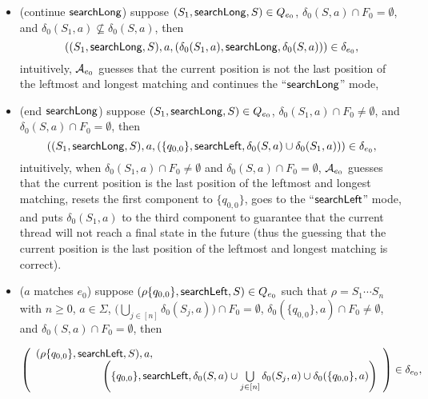 \begin{itemize}
\begin{itemize}
		\item (continue $\mathsf{searchLong}$) suppose $(S_1, \mathsf{searchLong}, S) \in Q_{e_0}$, $\delta_0(S,a) \cap F_0 = \emptyset$, and $\delta_0(S_1,a) \not \subseteq \delta_0(S,a)$, then 
		$$((S_1, \mathsf{searchLong}, S), a, (\delta_0(S_1,a), \mathsf{searchLong}, \delta_0(S,a))) \in \delta_{e_0},$$
		intuitively, $\mathcal{A}_{e_0}$ guesses that the current position is not the last position of the leftmost and longest matching and continues the ``$\mathsf{searchLong}$'' mode,
		\item (end $\mathsf{searchLong}$) suppose $(S_1, \mathsf{searchLong}, S) \in Q_{e_0}$, $\delta_0(S_1,a) \cap F_0 \neq \emptyset$, and $\delta_0(S,a) \cap F_0 = \emptyset$, then 
		$$((S_1, \mathsf{searchLong}, S), a, (\{q_{0,0}\}, \mathsf{searchLeft}, \delta_0(S,a) \cup \delta_0(S_1,a))) \in \delta_{e_0},$$
		intuitively, when $\delta_0(S_1,a) \cap F_0 \neq \emptyset$ and $\delta_0(S,a) \cap F_0 = \emptyset$, $\mathcal{A}_{e_0}$ guesses that the current position is the last position of the leftmost and longest matching, resets the first component to $\{q_{0,0}\}$, goes to the ``$\mathsf{searchLeft}$'' mode, and puts $\delta_0(S_1, a)$ to the third component to guarantee that the current thread will not reach a final state in the future (thus the guessing that the current position is the last position of the leftmost and longest matching is correct).
		\item ($a$ matches $e_0$) suppose $(\rho \{q_{0,0}\}, \mathsf{searchLeft}, S) \in Q_{e_0}$ such that $\rho = S_1 \cdots S_n$ with $n \ge 0$,  $a \in \Sigma$, $\big(\bigcup \limits_{j \in [n]} \delta_0(S_j, a) \big) \cap F_0 = \emptyset$, $\delta_0(\{q_{0,0}\}, a) \cap F_0 \neq \emptyset$, and $\delta_0(S,a) \cap F_0 = \emptyset$, then
		
		\medskip
		$\left(
		\begin{array}{l l}
		(\rho \{q_{0,0}\}, \searchleft, S), a, &\\
		& \hspace{-2cm} \left(\{q_{0,0}\}, \searchleft, \delta_0(S,a) \cup \bigcup \limits_{j \in [n]} \delta_0(S_j, a) \cup \delta_0(\{q_{0,0}\}, a) \right)
		\end{array}
		\right) \in \delta_{e_0},$
		

\end{itemize}
\end{itemize}
